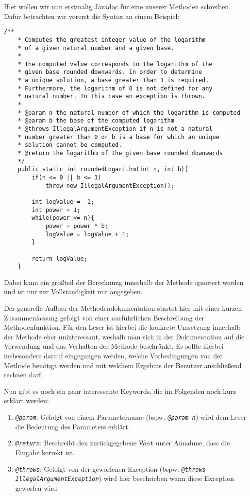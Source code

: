 \begin{Infobox}[Javadoc]
    Hier wollen wir nun erstmalig Javadoc für eine unserer Methoden schreiben. Dafür betrachten wir vorerst die Syntax an einem Beispiel:
    \begin{lstlisting}[numbers=none]
    /**
    * Computes the greatest integer value of the logarithm 
    * of a given natural number and a given base. 
    * 
    * The computed value corresponds to the logarithm of the
    * given base rounded downwards. In order to determine
    * a unique solution, a base greater than 1 is required.
    * Furthermore, the logarithm of 0 is not defined for any 
    * natural number. In this case an exception is thrown.
    * 
    * @param n the natural number of which the logarithm is computed
    * @param b the base of the computed logarithm
    * @throws IllegalArgumentException if n is not a natural
    * number greater than 0 or b is a base for which an unique
    * solution cannot be computed.
    * @return the logarithm of the given base rounded downwards
    */
    public static int roundedLogarithm(int n, int b){
        if(n <= 0 || b <= 1)
            throw new IllegalArgumentException();
        
        int logValue = -1;
        int power = 1;
        while(power <= n){
            power = power * b;
            logValue = logValue + 1;
        }

        return logValue;
    }
    \end{lstlisting}
    Dabei kann ein großteil der Berechnung innerhalb der Methode ignoriert werden und ist nur zur Vollständigkeit mit angegeben. \par
    Der generelle Aufbau der Methodendokumentation startet hier mit einer kurzen Zusammenfassung 
    gefolgt von einer ausführlichen Beschreibung der Methodenfunktion. Für den Leser ist hierbei die 
    konkrete Umsetzung innerhalb der Methode eher uninteressant, weshalb man sich in der Dokumentation
    auf die Verwendung und das Verhalten der Methode beschränkt. Es sollte hierbei insbesondere darauf 
    eingegangen werden, welche Vorbedingungen von der Methode benötigt werden und mit welchem Ergebnis 
    der Benutzer anschließend rechnen darf. \par 
    Nun gibt es noch ein paar interessante Keywords, die im Folgenden noch kurz erklärt werden:
    \begin{enumerate}[label=\roman*)]
        \item \textit{\texttt{@param}}: Gefolgt von einem Parametername (bspw. \textit{\texttt{@param n}}) wird dem
        Leser die Bedeutung des Parameters erklärt.
        \item \textit{\texttt{@return}}: Beschreibt den zurückgegebene Wert unter Annahme, dass die Eingabe korrekt ist.
        \item \textit{\texttt{@throws}}: Gefolgt von der geworfenen Exception (bspw. \textit{\texttt{@throws IllegalArgumentException}})
        wird hier beschrieben wann diese Exception geworfen wird.
    \end{enumerate}
\end{Infobox}
